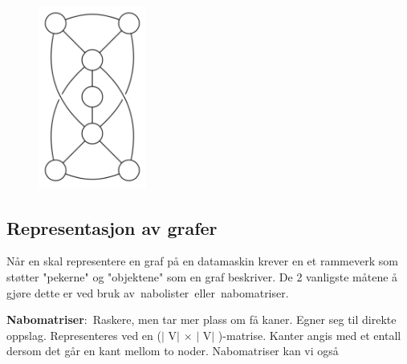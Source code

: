 \documentclass[12pt]{report}
\begin{document}
\begin{figure}[H]
	\begin{Center}
		\includegraphics[width=1.4in,height=2.37in]{./media/image64.png}
	\end{Center}
\end{figure}



\par


\vspace{\baselineskip}

\vspace{\baselineskip}
\begin{multicols}{2}

\vspace{\baselineskip}

\end{multicols}
\setlength{\parskip}{6.0pt}

\vspace{\baselineskip}
\subsection*{Representasjon av grafer}
\setlength{\parskip}{0.0pt}
Når en skal representere en graf på en datamaskin krever en et rammeverk som støtter "pekerne" og "objektene" som en graf beskriver. De 2 vanligste måtene å gjøre dette er ved bruk av nabolister eller nabomatriser.\par


\vspace{\baselineskip}
\textbf{Nabomatriser}:\ Raskere, men tar mer plass om få kaner. Egner seg til direkte oppslag. Representeres ved en  ($ \vert $ V$ \vert $ $ \times $ $ \vert $ V$ \vert $ )-matrise. Kanter angis med et entall dersom det går en kant mellom to noder. Nabomatriser kan vi også \par
\end{document}
